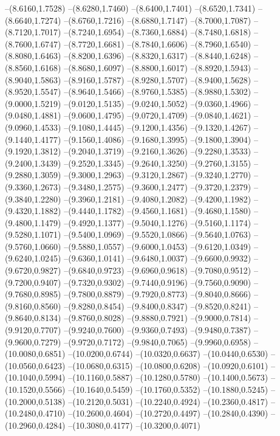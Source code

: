 {\begin{scope}
--(8.6160,1.7528)
--(8.6280,1.7460)
--(8.6400,1.7401)
--(8.6520,1.7341)
--(8.6640,1.7274)
--(8.6760,1.7216)
--(8.6880,1.7147)
--(8.7000,1.7087)
--(8.7120,1.7017)
--(8.7240,1.6954)
--(8.7360,1.6884)
--(8.7480,1.6818)
--(8.7600,1.6747)
--(8.7720,1.6681)
--(8.7840,1.6606)
--(8.7960,1.6540)
--(8.8080,1.6463)
--(8.8200,1.6396)
--(8.8320,1.6317)
--(8.8440,1.6248)
--(8.8560,1.6168)
--(8.8680,1.6097)
--(8.8800,1.6017)
--(8.8920,1.5943)
--(8.9040,1.5863)
--(8.9160,1.5787)
--(8.9280,1.5707)
--(8.9400,1.5628)
--(8.9520,1.5547)
--(8.9640,1.5466)
--(8.9760,1.5385)
--(8.9880,1.5302)
--(9.0000,1.5219)
--(9.0120,1.5135)
--(9.0240,1.5052)
--(9.0360,1.4966)
--(9.0480,1.4881)
--(9.0600,1.4795)
--(9.0720,1.4709)
--(9.0840,1.4621)
--(9.0960,1.4533)
--(9.1080,1.4445)
--(9.1200,1.4356)
--(9.1320,1.4267)
--(9.1440,1.4177)
--(9.1560,1.4086)
--(9.1680,1.3995)
--(9.1800,1.3904)
--(9.1920,1.3812)
--(9.2040,1.3719)
--(9.2160,1.3626)
--(9.2280,1.3533)
--(9.2400,1.3439)
--(9.2520,1.3345)
--(9.2640,1.3250)
--(9.2760,1.3155)
--(9.2880,1.3059)
--(9.3000,1.2963)
--(9.3120,1.2867)
--(9.3240,1.2770)
--(9.3360,1.2673)
--(9.3480,1.2575)
--(9.3600,1.2477)
--(9.3720,1.2379)
--(9.3840,1.2280)
--(9.3960,1.2181)
--(9.4080,1.2082)
--(9.4200,1.1982)
--(9.4320,1.1882)
--(9.4440,1.1782)
--(9.4560,1.1681)
--(9.4680,1.1580)
--(9.4800,1.1479)
--(9.4920,1.1377)
--(9.5040,1.1276)
--(9.5160,1.1174)
--(9.5280,1.1071)
--(9.5400,1.0969)
--(9.5520,1.0866)
--(9.5640,1.0763)
--(9.5760,1.0660)
--(9.5880,1.0557)
--(9.6000,1.0453)
--(9.6120,1.0349)
--(9.6240,1.0245)
--(9.6360,1.0141)
--(9.6480,1.0037)
--(9.6600,0.9932)
--(9.6720,0.9827)
--(9.6840,0.9723)
--(9.6960,0.9618)
--(9.7080,0.9512)
--(9.7200,0.9407)
--(9.7320,0.9302)
--(9.7440,0.9196)
--(9.7560,0.9090)
--(9.7680,0.8985)
--(9.7800,0.8879)
--(9.7920,0.8773)
--(9.8040,0.8666)
--(9.8160,0.8560)
--(9.8280,0.8454)
--(9.8400,0.8347)
--(9.8520,0.8241)
--(9.8640,0.8134)
--(9.8760,0.8028)
--(9.8880,0.7921)
--(9.9000,0.7814)
--(9.9120,0.7707)
--(9.9240,0.7600)
--(9.9360,0.7493)
--(9.9480,0.7387)
--(9.9600,0.7279)
--(9.9720,0.7172)
--(9.9840,0.7065)
--(9.9960,0.6958)
--(10.0080,0.6851)
--(10.0200,0.6744)
--(10.0320,0.6637)
--(10.0440,0.6530)
--(10.0560,0.6423)
--(10.0680,0.6315)
--(10.0800,0.6208)
--(10.0920,0.6101)
--(10.1040,0.5994)
--(10.1160,0.5887)
--(10.1280,0.5780)
--(10.1400,0.5673)
--(10.1520,0.5566)
--(10.1640,0.5459)
--(10.1760,0.5352)
--(10.1880,0.5245)
--(10.2000,0.5138)
--(10.2120,0.5031)
--(10.2240,0.4924)
--(10.2360,0.4817)
--(10.2480,0.4710)
--(10.2600,0.4604)
--(10.2720,0.4497)
--(10.2840,0.4390)
--(10.2960,0.4284)
--(10.3080,0.4177)
--(10.3200,0.4071)

\end{scope}}
